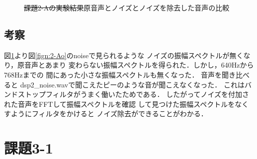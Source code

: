 \documentclass[11pt, a4paper, titlepage]{ltjsarticle}
\begin{document}
\begin{figure}[h]
\begin{center}
\begin{minipage}[t]{0.48\columnwidth}
        \label{fign:2-Az}
    \end{minipage}
    \end{center}
    \caption{\sout{課題2-Aの実験結果}原音声とノイズとノイズを除去した音声の比較}
\end{figure}


\subsection*{考察}
図\ref*{fign:2-Az}より図\ref*{fign:2-Ao}のnoiseで見られるような
ノイズの振幅スペクトルが無くなり，原音声とあまり
変わらない振幅スペクトルを得られた．しかし，640Hzから768Hzまでの
間にあった小さな振幅スペクトルも無くなった．
音声を聞き比べると
dsp2\_noise.wavで聞こえたピーのような音が聞こえなくなった．
これはバンドストップフィルタがうまく働いたためである．
したがってノイズを付加された音声をFFTして振幅スペクトルを確認
して見つけた振幅スペクトルをなくすようにフィルタをかけると
ノイズ除去ができることがわかる．

\newpage
\section*{課題3-1}
\end{document}
